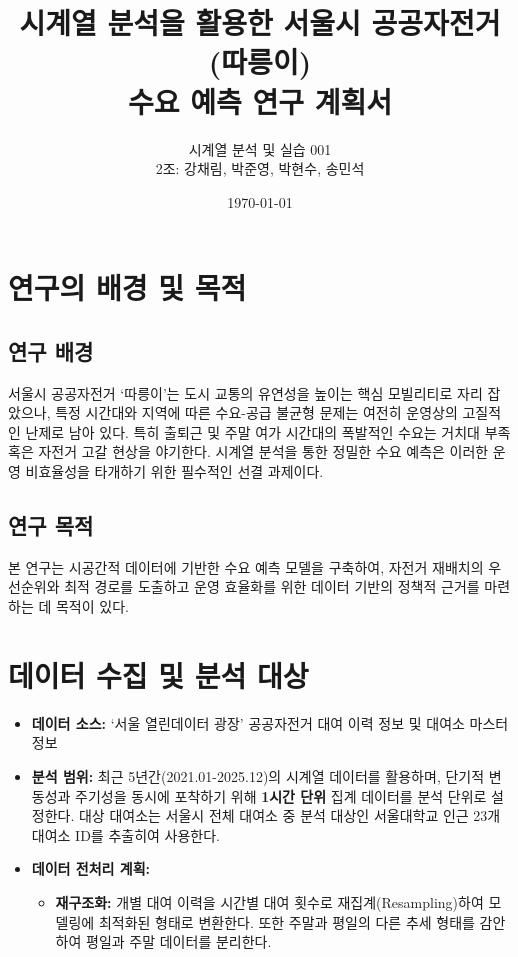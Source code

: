 \documentclass[11pt, a4paper]{article}
\title{\textbf{시계열 분석을 활용한 서울시 공공자전거(따릉이) \\ 수요 예측 연구 계획서}}
\author{시계열 분석 및 실습 001 \\ [1ex] 2조: 강채림, 박준영, 박현수, 송민석}
\date{\today}
\begin{document}
	
	\maketitle
	
	\section{연구의 배경 및 목적}
	\subsection{연구 배경}
	서울시 공공자전거 ‘따릉이’는 도시 교통의 유연성을 높이는 핵심 모빌리티로 자리 잡았으나, 특정 시간대와 지역에 따른 수요-공급 불균형 문제는 여전히 운영상의 고질적인 난제로 남아 있다. 특히 출퇴근 및 주말 여가 시간대의 폭발적인 수요는 거치대 부족 혹은 자전거 고갈 현상을 야기한다. 시계열 분석을 통한 정밀한 수요 예측은 이러한 운영 비효율성을 타개하기 위한 필수적인 선결 과제이다.
	
	\subsection{연구 목적}
	본 연구는 시공간적 데이터에 기반한 수요 예측 모델을 구축하여, 자전거 재배치의 우선순위와 최적 경로를 도출하고 운영 효율화를 위한 데이터 기반의 정책적 근거를 마련하는 데 목적이 있다.
	
	\section{데이터 수집 및 분석 대상}
	\begin{itemize}
		\item \textbf{데이터 소스:} ‘서울 열린데이터 광장’ 공공자전거 대여 이력 정보 및 대여소 마스터 정보
		\item \textbf{분석 범위:} 최근 5년간(2021.01-2025.12)의 시계열 데이터를 활용하며, 단기적 변동성과 주기성을 동시에 포착하기 위해 \textbf{1시간 단위} 집계 데이터를 분석 단위로 설정한다. 대상 대여소는 서울시 전체 대여소 중 분석 대상인 서울대학교 인근 23개 대여소 ID를 추출히여 사용한다.
		\item \textbf{데이터 전처리 계획:}
		\begin{itemize}
			\item \textbf{재구조화:} 개별 대여 이력을 시간별 대여 횟수로 재집계(Resampling)하여 모델링에 최적화된 형태로 변환한다. 또한 주말과 평일의 다른 추세 형태를 감안하여 평일과 주말 데이터를 분리한다.
		\end{itemize}
	\end{itemize}
	
\end{document}
